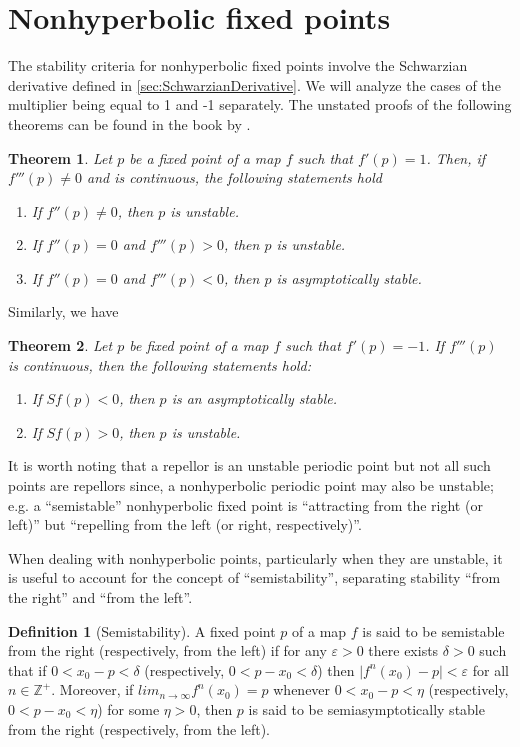\documentclass[10pt,twoside,titlepage]{book}
\numberwithin{equation}{chapter}
\numberwithin{figure}{chapter}
\numberwithin{table}{chapter}
\theoremstyle{plain}%
\newtheorem{thm}{Theorem}[chapter]
\theoremstyle{definition}
\newtheorem{defn}{Definition}[chapter]
\theoremstyle{remark}
\begin{document}
\section{Nonhyperbolic fixed points}
\label{sec:nonhyperbolic}

The stability criteria for nonhyperbolic fixed points involve the Schwarzian derivative defined in \ref{sec:SchwarzianDerivative}. We will analyze the cases of the multiplier being equal to 1 and -1 separately. The unstated proofs of the following theorems can be found in the book by \cite{Elaydi}.

\begin{thm}
	\label{thm:nonhyperbolic-pos}
	Let $p$ be a fixed point of a map $f$ such that $f'(p)=1$. Then, if $f'''(p)\neq 0$ and is continuous, the following statements hold
	\begin{enumerate}
		\item If $f''(p)\neq 0$, then $p$ is unstable.
		\item If $f''(p)=0$ and $f'''(p)>0$, then $p$ is unstable.
		\item If $f''(p)=0$ and $f'''(p)<0$, then $p$ is asymptotically stable.
	\end{enumerate}
\end{thm}

Similarly, we have

\begin{thm}
	\label{thm:nonhyperbolic-neg}
	Let $p$ be fixed point of a map $f$ such that $f'(p)=-1$. If $f'''(p)$ is continuous, then the following statements hold:
	\begin{enumerate}
		\item If $Sf(p)<0$, then $p$ is an asymptotically stable.
		\item If $Sf(p)>0$, then $p$ is unstable.
	\end{enumerate}
\end{thm}

It is worth noting that a repellor is an unstable periodic point but not all such points are repellors since, a nonhyperbolic periodic point may also be unstable; e.g. a ``semistable'' nonhyperbolic fixed point is ``attracting from the right (or left)'' but ``repelling from the left (or right, respectively)''.

When dealing with nonhyperbolic points, particularly when they are unstable, it is useful to account for the concept of ``semistability'', separating stability ``from the right'' and ``from the left''.

\begin{defn} [Semistability]
	\label{def:semistability}
	A fixed point $p$ of a map $f$ is said to be semistable from the right (respectively, from the left) if for any $\varepsilon>0$ there exists $\delta>0$ such that if $0<x_0-p<\delta$ (respectively, $0<p-x_0<\delta$) then $\vert f^n(x_0)-p\vert<\varepsilon$ for all $n\in\mathbb{Z}^+$. Moreover, if $lim_{n\rightarrow\infty}f^n(x_0)=p$ whenever $0<x_0-p<\eta$ (respectively, $0<p-x_0<\eta$) for some $\eta>0$, then $p$ is said to be semiasymptotically stable from the right (respectively, from the left).
\end{defn}
\end{document}
